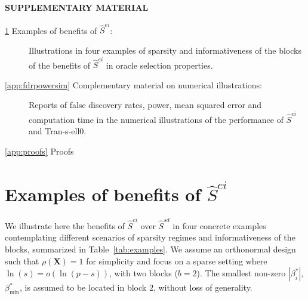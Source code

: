 \documentclass[
  12pt]{article}
\newcommand{\bX}{\mathbf{X}}
\begin{document}
\def\spacingset#1{\renewcommand{\baselinestretch}%
{#1}\small\normalsize} \spacingset{1}




\label{supplementary-material}
\bigskip

\begin{center}

{\large\bf SUPPLEMENTARY MATERIAL}

\end{center}

\renewcommand{\thesection}{S\arabic{section}}
\renewcommand{\theequation}{S\arabic{equation}}
\renewcommand{\thefigure}{S\arabic{figure}}
\renewcommand{\thetable}{S\arabic{table}}


\begin{description}
\item[\ref{app:exbenef} Examples of benefits of $\hat S^{ei}$:]
Illustrations in four examples of sparsity and informativeness of the blocks of the benefits of $\hat S^{ei}$ in oracle selection properties.
\item[\ref{app:fdrpowersim} Complementary material on numerical illustrations:]
Reports of false discovery rates, power, mean squared error and computation time in the numerical illustrations of the performance of $\hat S^{ei}$ and Tran-s-ell0.
\item[\ref{app:proofs} Proofs]
\end{description}

\setcounter{section}{0}
\setcounter{equation}{0}
\setcounter{figure}{0}
\setcounter{table}{0}

\section{Examples of benefits of $\hat S^{ei}$}\label{app:exbenef}

We illustrate here the benefits of $\hat S^{ei}$ over $\hat S^{sd}$ in four concrete examples contemplating different scenarios of sparsity regimes and informativeness of the blocks, summarized in Table~\ref{tab:examples}. We assume an orthonormal design such that $\rho(\bX)=1$ for simplicity and focus on a sparse setting where $\ln(s)=o(\ln(p-s))$, with two blocks ($b=2$). The smallest non-zero $|\beta_i^*|$, $\beta_{\min}^*$, is assumed to be located in block $2$, without loss of generality. 
\end{document}
